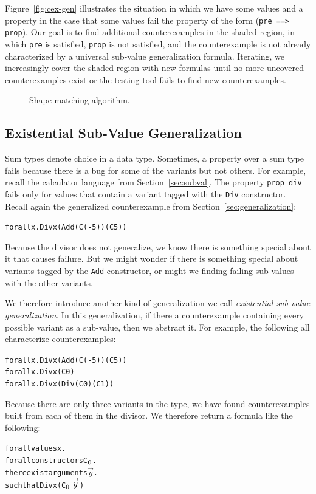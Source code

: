 \documentclass[10pt]{sigplanconf}
\newenvironment{code}{\begin{alltt}}{\end{alltt}}
\newcommand{\ttp}[1]{\texttt{#1}}
\begin{document}
Figure~\ref{fig:cex-gen} illustrates the situation in which we have some values
and a property in the case that some values fail the property of the form
(\ttp{pre ==> prop}).  Our goal is to find additional counterexamples in the
shaded region, in which \ttp{pre} is satisfied, \ttp{prop} is not satisfied, and
the counterexample is not already characterized by a universal sub-value
generalization formula.  Iterating, we increasingly cover the shaded region
with new formulas until no more uncovered counterexamples exist or the testing
tool fails to find new counterexamples.

\begin{figure}

  \caption{Shape matching algorithm.}
  \label{fig:matches}
\end{figure}




\subsection{Existential Sub-Value Generalization}

Sum types denote choice in a data type.  Sometimes, a property over a sum type
fails because there is a bug for some of the variants but not others.  For
example, recall the calculator language from Section~\ref{sec:subval}.  The
property \ttp{prop\_div} fails only for values that contain a variant tagged
with the \ttp{Div} constructor.  Recall again the generalized counterexample
from Section~\ref{sec:generalization}:
%
\begin{code}
forall x . Div x (Add (C (-5)) (C 5))
\end{code}
%
\noindent
Because the divisor does not generalize, we know there is something special
about it that causes failure.  But we might wonder if there is something special
about variants tagged by the \ttp{Add} constructor, or might we finding failing
sub-values with the other variants.

We therefore introduce another kind of generalization we call \emph{existential
  sub-value generalization}.  In this generalization, if there a counterexample
containing every possible variant as a sub-value, then we abstract it.  For
example, the following all characterize counterexamples:
%
\begin{code}
forall x . Div x (Add (C (-5)) (C 5))
forall x . Div x (C 0)
forall x . Div x (Div (C 0) (C 1))
\end{code}
%
\noindent
Because there are only three variants in the type, we have found counterexamples
built from each of them in the divisor.  We therefore return a formula like the
following:
%
\begin{code}
forall values x .
  forall constructors C\(\sb{0}\) .
    there exist arguments \(\stackrel{\rightarrow}{y}\) .
      such that Div x (C\(\sb{0} \stackrel{\rightarrow}{y}\))
\end{code}
%
\end{document}
